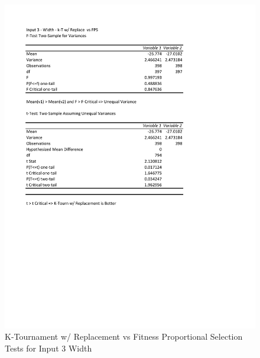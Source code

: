\documentclass[times]{article}
\begin{document}
	\begin{figure}
		\caption{K-Tournament w/ Replacement vs Fitness Proportional Selection Tests for Input 3 Width}
		\label{fig:3parent1_moea}
		\includegraphics[width=\textwidth]{./t_test/3_parent1_moea.pdf}
	\end{figure}
\end{document}
